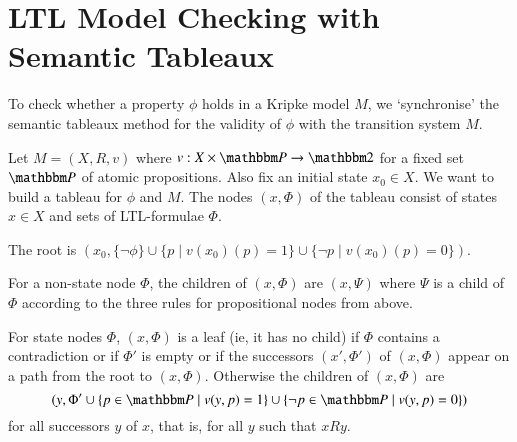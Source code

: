 \section{LTL Model Checking with Semantic Tableaux}

To check whether a property $\phi$ holds in a Kripke model $M$, we
`synchronise' the semantic tableaux method for the validity of $\phi$
with the transition system $M$.

\medskip\noindent
Let $M=(X,R,v)$ where $v:X\times\bbP\to\bbtwo$ for a fixed set $\bbP$ of
atomic propositions. Also fix an initial state $x_0\in X$. 
%
We want to build a tableau for $\phi$ and $M$. The nodes $(x,\Phi)$ of
the tableau consist of states $x\in X$ and sets of LTL-formulae
$\Phi$. 


\medskip\noindent The root is $(x_0,\{\neg\phi\}\cup \{p\mid
v(x_0)(p)=1\}\cup\{\neg p \mid v(x_0)(p)=0\} )$.

\medskip\noindent For a non-state node $\Phi$, the children of
$(x,\Phi)$ are $(x,\Psi)$ where $\Psi$ is a child of $\Phi$ according
to the three rules for propositional nodes from above.

\medskip\noindent For state nodes $\Phi$, $(x,\Phi)$ is a leaf (ie, it
has no child) if $\Phi$ contains a contradiction or if $\Phi'$ is
empty or if the successors $(x',\Phi')$ of $(x,\Phi)$ appear on a path
from the root to $(x,\Phi)$. 
%
Otherwise the children of $(x,\Phi)$ are
%
$$(y,\Phi'\cup\{p\in\bbP \mid
v(y,p)=1\}\cup \{\neg p\in\bbP \mid v(y,p)=0\})$$ 
%
for all successors $y$ of $x$, that is, for all $y$ such that $xRy$.





